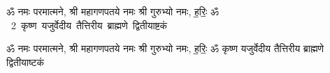 \documentclass[17pt]{extarticle}
\begin{document}
\begin{titlepage}
    \begin{center}
 
\begin{sanskrit}
    { \Large
    ॐ नमः परमात्मने, श्री महागणपतये नमः
श्री गुरुभ्यो नमः, ह॒रिः॒ ॐ 
    }
    \\
    \vspace{2.5cm}
    \mbox{ \Huge
    2       कृष्ण यजुर्वेदीय तैत्तिरीय ब्राह्मणे द्वितीयाष्टकं    }
\end{sanskrit}
\end{center}

\end{titlepage}
\tableofcontents
\pagebreak
ॐ नमः परमात्मने, श्री महागणपतये नमः
श्री गुरुभ्यो नमः, ह॒रिः॒ ॐ        कृष्ण यजुर्वेदीय तैत्तिरीय ब्राह्मणे द्वितीयाष्टकं  \newline
\end{document}
